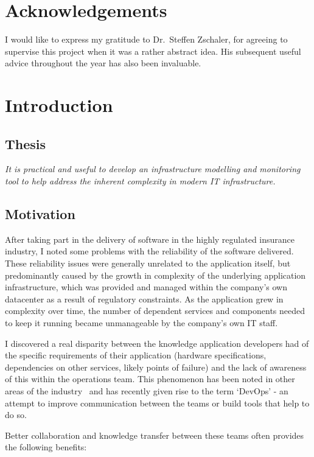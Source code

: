 \documentclass{cshonours}
\begin{document}
\chapter*{Acknowledgements}

I would like to express my gratitude to Dr.\ Steffen Zschaler, for agreeing to supervise this project when it was a rather abstract idea. His subsequent useful advice throughout the year has also been invaluable.

\tableofcontents

\chapter{Introduction}

\section{Thesis}
\textit{It is practical and useful to develop an infrastructure modelling and monitoring tool to help address the inherent complexity in modern IT infrastructure.}
\section{Motivation}

After taking part in the delivery of software in the highly regulated insurance industry, I noted some problems with the reliability of the software delivered. These reliability issues were generally unrelated to the application itself, but predominantly caused by the growth in complexity of the underlying application infrastructure, which was provided and managed within the company's own datacenter as a result of regulatory constraints. As the application grew in complexity over time, the number of dependent services and components needed to keep it running became unmanageable by the company's own IT staff.

I discovered a real disparity between the knowledge application developers had of the specific requirements of their application (hardware specifications, dependencies on other services, likely points of failure) and the lack of awareness of this within the operations team. This phenomenon has been noted in other areas of the industry~\cite{DevOps} and has recently given rise to the term `DevOps' - an attempt to improve communication between the teams or build tools that help to do so.

Better collaboration and knowledge transfer between these teams often provides the following benefits:
\end{document}
